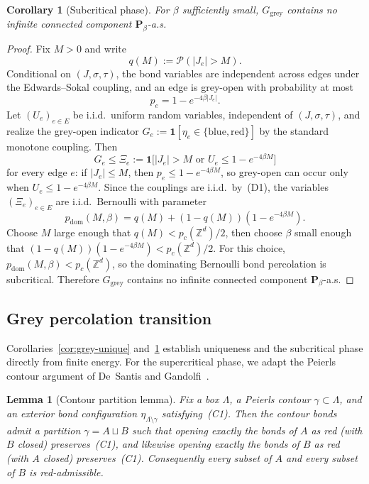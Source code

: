 \documentclass[11pt]{article}
\newtheorem{lemma}[theorem]{Lemma}
\newtheorem{corollary}[theorem]{Corollary}
\numberwithin{theorem}{section}
\theoremstyle{remark}
\begin{document}
\begin{corollary}[Subcritical phase]\label{cor:grey-sub}
For $\beta$ sufficiently small, $G_{\mathrm{grey}}$ contains no infinite connected component $\mathbf{P}_\beta$-a.s.
\end{corollary}

\begin{proof}
Fix $M > 0$ and write
\[
  q(M) := \mathscr{P}(|J_e| > M).
\]
Conditional on $(J, \sigma, \tau)$, the bond variables are independent across edges under the Edwards--Sokal coupling, and an edge is grey-open with probability at most
\[
  p_e = 1 - e^{-4\beta |J_e|}.
\]
Let $(U_e)_{e \in E}$ be i.i.d.\ uniform random variables, independent of $(J, \sigma, \tau)$, and realize the grey-open indicator $G_e := \mathbf{1}[\eta_e \in \{\text{blue}, \text{red}\}]$ by the standard monotone coupling.
Then
\[
  G_e \leq \Xi_e := \mathbf{1}\bigl[|J_e| > M \text{ or } U_e \leq 1 - e^{-4\beta M}\bigr]
\]
for every edge $e$: if $|J_e| \leq M$, then $p_e \leq 1 - e^{-4\beta M}$, so grey-open can occur only when $U_e \leq 1 - e^{-4\beta M}$.
Since the couplings are i.i.d.\ by~\textup{(D1)}, the variables $(\Xi_e)_{e \in E}$ are i.i.d.\ Bernoulli with parameter
\[
  p_{\mathrm{dom}}(M,\beta)
  = q(M) + (1-q(M))(1-e^{-4\beta M}).
\]
Choose $M$ large enough that $q(M) < p_c(\mathbb{Z}^d)/2$, then choose $\beta$ small enough that $(1-q(M))(1-e^{-4\beta M}) < p_c(\mathbb{Z}^d)/2$.
For this choice, $p_{\mathrm{dom}}(M,\beta) < p_c(\mathbb{Z}^d)$, so the dominating Bernoulli bond percolation is subcritical.
Therefore $G_{\mathrm{grey}}$ contains no infinite connected component $\mathbf{P}_\beta$-a.s.
\end{proof}

\subsection{Grey percolation transition}

Corollaries~\ref{cor:grey-unique} and~\ref{cor:grey-sub} establish uniqueness and the subcritical phase directly from finite energy.
For the supercritical phase, we adapt the Peierls contour argument of De~Santis and Gandolfi~\cite[Theorem~2.2]{DSG1999}.

\begin{lemma}[Contour partition lemma]\label{lem:contour-partition}
Fix a box $\Lambda$, a Peierls contour $\gamma \subset \Lambda$, and an exterior bond configuration $\eta_{\Lambda \setminus \gamma}$ satisfying~\textup{(C1)}.
Then the contour bonds admit a partition $\gamma = A \sqcup B$ such that opening exactly the bonds of $A$ as red (with $B$ closed) preserves~\textup{(C1)}, and likewise opening exactly the bonds of $B$ as red (with $A$ closed) preserves~\textup{(C1)}.
Consequently every subset of $A$ and every subset of $B$ is red-admissible.
\end{lemma}
\end{document}
